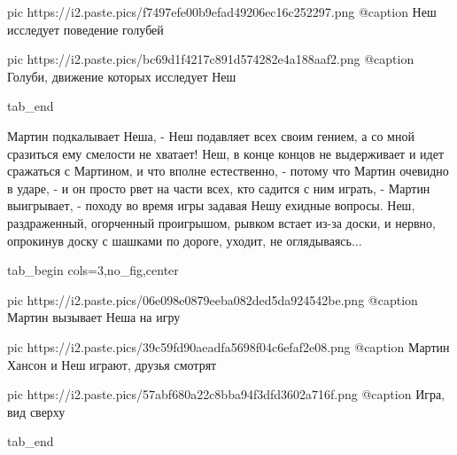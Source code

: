 		 pic https://i2.paste.pics/f7497efe00b9efad49206ec16c252297.png
		 @caption Неш исследует поведение голубей
		 
		 pic https://i2.paste.pics/bc69d1f4217c891d574282e4a188aaf2.png
		 @caption Голуби, движение которых исследует Неш

  tab_end
\fi

Мартин подкалывает Неша, - Неш подавляет всех своим гением, а со мной сразиться
ему смелости не хватает!  Неш, в конце концов не выдерживает и идет сражаться с
Мартином, и что вполне естественно, - потому что Мартин очевидно в ударе, - и
он просто рвет на части всех, кто садится с ним играть, - Мартин выигрывает, -
походу во время игры задавая Нешу ехидные вопросы. Неш, раздраженный,
огорченный проигрышом, рывком встает из-за доски, и нервно, опрокинув доску с
шашками по дороге, уходит, не оглядываясь...

\ifcmt
  tab_begin cols=3,no_fig,center

     pic https://i2.paste.pics/06e098e0879eeba082ded5da924542be.png
		 @caption Мартин вызывает Неша на игру

		 pic https://i2.paste.pics/39c59fd90aeadfa5698f04c6efaf2e08.png
		 @caption Мартин Хансон и Неш играют, друзья смотрят

		 pic https://i2.paste.pics/57abf680a22c8bba94f3dfd3602a716f.png
		 @caption Игра, вид сверху

  tab_end
\fi
